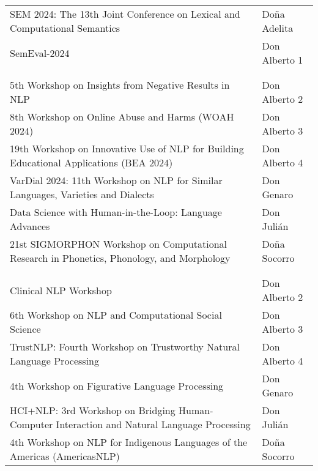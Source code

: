 \begin{center}
\renewcommand{\arraystretch}{1.1}
\vspace{-1em}
\begin{tabular}{@{}%
  >{\raggedright\arraybackslash}p{}
  >{\raggedright\arraybackslash}p{}}

  \multicolumn{2}{l}{\hspace{-1mm}\large Thursday--Friday} \\  \hline
  *SEM 2024: The 13th Joint Conference on Lexical and Computational Semantics & Do\~na Adelita \\
  SemEval-2024 & Don Alberto 1 \\
  \\

  \multicolumn{2}{l}{\hspace{-1mm}\large Thursday} \\ \hline
  5th Workshop on Insights from Negative Results in NLP & Don Alberto 2 \\
  8th Workshop on Online Abuse and Harms (WOAH 2024) & Don Alberto 3 \\
  19th Workshop on Innovative Use of NLP for Building Educational Applications (BEA 2024) & Don Alberto 4 \\
  VarDial 2024: 11th Workshop on NLP for Similar Languages, Varieties and Dialects & Don Genaro \\
  Data Science with Human-in-the-Loop: Language Advances & Don Juli\'an \\
  21st SIGMORPHON Workshop on Computational Research in Phonetics, Phonology, and Morphology & Do\~na Socorro \\
  \\

  \multicolumn{2}{l}{\hspace{-1mm}\large Friday} \\ \hline
  Clinical NLP Workshop & Don Alberto 2 \\
  6th Workshop on NLP and Computational Social Science & Don Alberto 3 \\
  TrustNLP: Fourth Workshop on Trustworthy Natural Language Processing & Don Alberto 4 \\
  4th Workshop on Figurative Language Processing & Don Genaro \\
  HCI+NLP: 3rd Workshop on Bridging Human-Computer Interaction and Natural Language Processing & Don Juli\'an \\
  4th Workshop on NLP for Indigenous Languages of the Americas (AmericasNLP) & Do\~na Socorro \\

\end{tabular}
\end{center}
